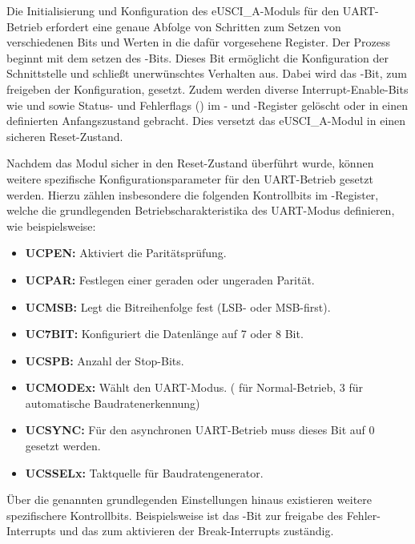 Die Initialisierung und Konfiguration des eUSCI\_A-Moduls f\"ur den UART-Betrieb erfordert eine genaue Abfolge von Schritten zum Setzen von verschiedenen Bits und Werten in die daf\"ur vorgesehene Register. Der Prozess beginnt mit dem setzen des -Bits. Dieses Bit erm\"oglicht die Konfiguration der Schnittstelle und schlie{\ss}t unerw\"unschtes Verhalten aus. Dabei wird das -Bit, zum freigeben der Konfiguration, gesetzt. Zudem werden diverse Interrupt-Enable-Bits wie  und  sowie Status- und Fehlerflags () im - und -Register gel\"oscht oder in einen definierten Anfangszustand gebracht. Dies versetzt das eUSCI\_A-Modul in einen sicheren Reset-Zustand.

Nachdem das Modul sicher in den Reset-Zustand \"uberf\"uhrt wurde, k\"onnen weitere spezifische Konfigurationsparameter f\"ur den UART-Betrieb gesetzt werden. Hierzu z\"ahlen insbesondere die folgenden Kontrollbits im -Register, welche die grundlegenden Betriebscharakteristika des UART-Modus definieren, wie beispielsweise:

\begin{itemize}
	\item \textbf{UCPEN:} Aktiviert die Parit\"atspr\"ufung.
	\item \textbf{UCPAR:} Festlegen einer geraden oder ungeraden Parit\"at.
	\item \textbf{UCMSB:} Legt die Bitreihenfolge fest (LSB- oder MSB-first).
	\item \textbf{UC7BIT:} Konfiguriert die Datenl\"ange auf 7 oder 8 Bit.
	\item \textbf{UCSPB:} Anzahl der Stop-Bits.
	\item \textbf{UCMODEx:} W\"ahlt den UART-Modus. ( f\"ur Normal-Betrieb, 3 f\"ur  automatische Baudratenerkennung)
	\item \textbf{UCSYNC:} F\"ur den asynchronen UART-Betrieb muss dieses Bit auf 0 gesetzt werden.
	\item \textbf{UCSSELx:} Taktquelle f\"ur Baudratengenerator.
\end{itemize}

\"Uber die genannten grundlegenden Einstellungen hinaus existieren weitere spezifischere Kontrollbits. Beispielsweise ist das -Bit zur freigabe des Fehler-Interrupts und das  zum aktivieren der Break-Interrupts zust\"andig. 

